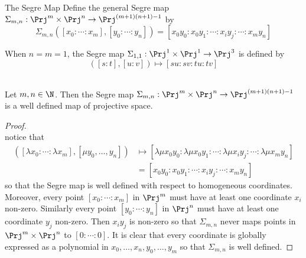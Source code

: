 \documentclass[a4paper]{article}
\begin{document}
\begin{defn}{The Segre Map}{} Define the general Segre map $\Sigma_{m,n}:\Prj^m\times\Prj^n\to\Prj^{(m+1)(n+1)-1}$ by $$\Sigma_{m,n}([x_0:\cdots:x_m],[y_0:\cdots:y_n])=[x_0y_0:x_0y_1:\cdots:x_iy_j:\cdots:x_my_n]$$
\end{defn}

\begin{eg}{}{}
When $n=m=1$, the Segre map $\Sigma_{1,1}:\Prj^1\times\Prj^1\to\Prj^3$ is defined by $$([s:t],[u:v])\mapsto[su:sv:tu:tv]$$
\end{eg}

\begin{lmm}{}{}\\
Let $m,n\in\N$. Then the Segre map $\Sigma_{m,n}:\Prj^m\times\Prj^n\to\Prj^{(m+1)(n+1)-1}$ is a well defined map of projective space. 
\begin{proof}\\
notice that 
\begin{align*}
([\lambda x_0:\cdots:\lambda x_m],[\mu y_0,\dots,y_n])&\mapsto[\lambda\mu x_0y_0:\lambda\mu x_0y_1:\cdots:\lambda\mu x_iy_j:\cdots:\lambda\mu x_my_n]\\
&=[x_0y_0:x_0y_1:\cdots:x_iy_j:\cdots:x_my_n]
\end{align*} so that the Segre map is well defined with respect to homogeneous coordinates. Moreover, every point $[x_0:\cdots:x_m]$ in $\Prj^m$ must have at least one coordinate $x_i$ non-zero. Similarly every point $[y_0:\cdots:y_n]$ in $\Prj^n$ must have at least one coordinate $y_j$ non-zero. Then $x_iy_j$ is non-zero so that $\Sigma_{m,n}$ never maps points in $\Prj^m\times\Prj^n$ to $[0:\cdots:0]$. It is clear that every coordinate is globally expressed as a polynomial in $x_0,\dots,x_n,y_0,\dots,y_m$ so that $\Sigma_{m,n}$ is well defined. 
\end{proof}
\end{lmm}
\end{document}
